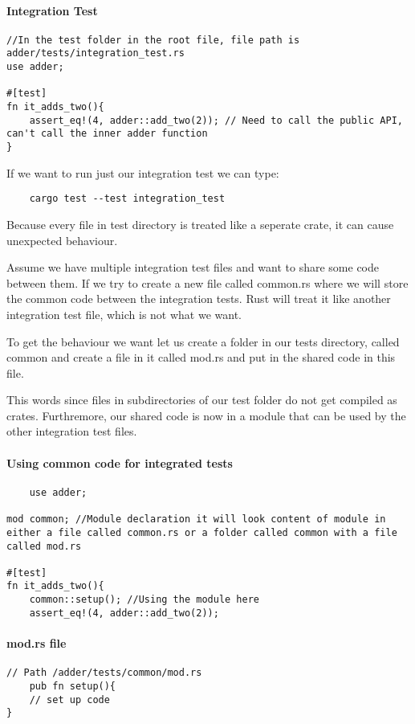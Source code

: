 \paragraph*{Integration Test}\begin{lstlisting}
//In the test folder in the root file, file path is adder/tests/integration_test.rs
use adder;

#[test]
fn it_adds_two(){
    assert_eq!(4, adder::add_two(2)); // Need to call the public API, can't call the inner adder function
}
\end{lstlisting}
If we want to run just our integration test we can type:\begin{lstlisting}
    cargo test --test integration_test
\end{lstlisting}

Because every file in test directory is treated like a seperate crate, it can cause unexpected behaviour.

Assume we have multiple integration test files and want to share some code between them. If we try to create a new file called common.rs where we will store the common code between the integration tests. Rust will treat it like another integration test file, which is not what we want.

To get the behaviour we want let us create a folder in our tests directory, called common and create a file in it called mod.rs and put in the shared code in this file.

This words since files in subdirectories of our test folder do not get compiled as crates. Furthremore, our shared code is now in a module that can be used by the other integration test files.

\paragraph*{Using common code for integrated tests}\begin{lstlisting}
    use adder;

mod common; //Module declaration it will look content of module in either a file called common.rs or a folder called common with a file called mod.rs 

#[test]
fn it_adds_two(){
    common::setup(); //Using the module here 
    assert_eq!(4, adder::add_two(2));
\end{lstlisting}
\paragraph*{mod.rs file}\begin{lstlisting}
// Path /adder/tests/common/mod.rs
    pub fn setup(){
    // set up code
}
\end{lstlisting}

